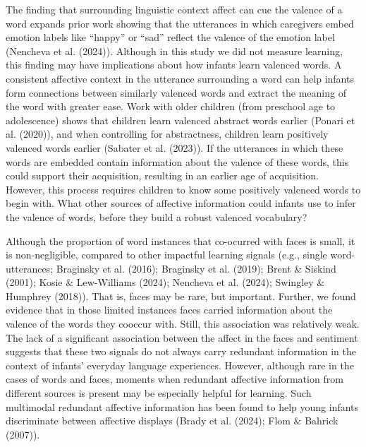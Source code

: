 \documentclass[10pt, letterpaper]{article}
\begin{document}
The finding that surrounding linguistic context affect can cue the
valence of a word expands prior work showing that the utterances in
which caregivers embed emotion labels like ``happy'' or ``sad'' reflect
the valence of the emotion label (Nencheva et al. (2024)). Although in
this study we did not measure learning, this finding may have
implications about how infants learn valenced words. A consistent
affective context in the utterance surrounding a word can help infants
form connections between similarly valenced words and extract the
meaning of the word with greater ease. Work with older children (from
preschool age to adolescence) shows that children learn valenced
abstract words earlier (Ponari et al. (2020)), and when controlling for
abstractness, children learn positively valenced words earlier (Sabater
et al. (2023)). If the utterances in which these words are embedded
contain information about the valence of these words, this could support
their acquisition, resulting in an earlier age of acquisition. However,
this process requires children to know some positively valenced words to
begin with. What other sources of affective information could infants
use to infer the valence of words, before they build a robust valenced
vocabulary?

Although the proportion of word instances that co-ocurred with faces is
small, it is non-negligible, compared to other impactful learning
signals (e.g., single word-utterances; Braginsky et al. (2016);
Braginsky et al. (2019); Brent \& Siskind (2001); Kosie \& Lew-Williams
(2024); Nencheva et al. (2024); Swingley \& Humphrey (2018)). That is,
faces may be rare, but important. Further, we found evidence that in
those limited instances faces carried information about the valence of
the words they cooccur with. Still, this association was relatively
weak. The lack of a significant association between the affect in the
faces and sentiment suggests that these two signals do not always carry
redundant information in the context of infants' everyday language
experiences. However, although rare in the cases of words and faces,
moments when redundant affective information from different sources is
present may be especially helpful for learning. Such multimodal
redundant affective information has been found to help young infants
discriminate between affective displays (Brady et al. (2024); Flom \&
Bahrick (2007)).
\end{document}
